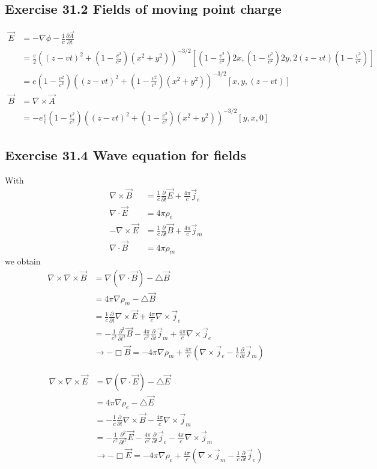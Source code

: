 \documentclass[10pt,a4paper]{book}
\theoremstyle{definition}
\begin{document}
\subsection{Exercise 31.2 Fields of moving point charge}
\begin{align}
	\vec{E}&=-\nabla\phi-\frac{1}{c}\frac{\partial\vec{A}}{\partial t}\\
	&=\frac{e}{2}\left((z-vt)^2+(1-\frac{v^2}{c^2})(x^2+y^2)\right)^{-3/2}[(1-\frac{v^2}{c^2})2x,(1-\frac{v^2}{c^2})2y,2(z-vt)(1-\frac{v^2}{c^2})]\\
	&=e(1-\frac{v^2}{c^2})\left((z-vt)^2+(1-\frac{v^2}{c^2})(x^2+y^2)\right)^{-3/2}[x,y,(z-vt)]\\
	\vec{B}&=\nabla\times\vec{A}\\
	&=-e\frac{v}{c}(1-\frac{v^2}{c^2})\left((z-vt)^2+(1-\frac{v^2}{c^2})(x^2+y^2)\right)^{-3/2}[y,x,0]
\end{align}

\subsection{Exercise 31.4 Wave equation for fields}
With
\begin{align}
\nabla\times\vec{B}&=\frac{1}{c}\frac{\partial}{\partial t}\vec{E}+\frac{4\pi}{c}\vec{j}_e\\
\nabla\cdot\vec{E}&=4\pi\rho_e\\
-\nabla\times\vec{E}&=\frac{1}{c}\frac{\partial}{\partial t}\vec{B}+\frac{4\pi}{c}\vec{j}_m\\
\nabla\cdot\vec{B}&=4\pi\rho_m
\end{align}
we obtain
\begin{align}
\nabla\times\nabla\times\vec{B}
&=\nabla(\nabla\cdot\vec{B})-\triangle\vec{B}\\
&=4\pi\nabla\rho_m-\triangle\vec{B}\\
&=\frac{1}{c}\frac{\partial}{\partial t}\nabla\times\vec{E}+\frac{4\pi}{c}\nabla\times\vec{j}_e\\
&=-\frac{1}{c^2}\frac{\partial^2}{\partial t^2}\vec{B}-\frac{4\pi}{c^2}\frac{\partial}{\partial t}\vec{j}_m+\frac{4\pi}{c}\nabla\times\vec{j}_e\\
&\rightarrow-\Box\vec{B}=-4\pi\nabla\rho_m+\frac{4\pi}{c}(\nabla\times\vec{j}_e-\frac{1}{c}\frac{\partial}{\partial t}\vec{j}_m)
\end{align}

\begin{align}
\nabla\times\nabla\times\vec{E}
&=\nabla(\nabla\cdot\vec{E})-\triangle\vec{E}\\
&=4\pi\nabla\rho_e-\triangle\vec{E}\\
&=-\frac{1}{c}\frac{\partial}{\partial t}\nabla\times\vec{B}-\frac{4\pi}{c}\nabla\times\vec{j}_m\\
&=-\frac{1}{c^2}\frac{\partial^2}{\partial t^2}\vec{E}-\frac{4\pi}{c^2}\frac{\partial}{\partial t}\vec{j}_e-\frac{4\pi}{c}\nabla\times\vec{j}_m\\
&\rightarrow-\Box\vec{E}=-4\pi\nabla\rho_e+\frac{4\pi}{c}(\nabla\times\vec{j}_m-\frac{1}{c}\frac{\partial}{\partial t}\vec{j}_e)
\end{align}
\end{document}
